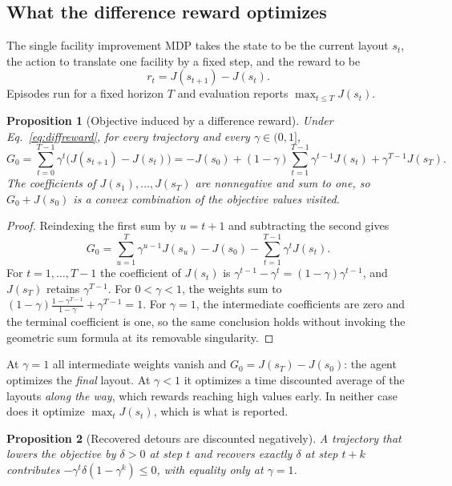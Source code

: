 \documentclass[preprint,12pt,authoryear]{elsarticle}
\newtheorem{prop}{Proposition}
\begin{document}
\subsection{What the difference reward optimizes}
The single facility improvement MDP takes the state to be the current
layout $s_t$, the action to translate one facility by a fixed step, and the
reward to be
\begin{equation}
r_t=J(s_{t+1})-J(s_t).
\label{eq:diffreward}
\end{equation}
Episodes run for a fixed horizon $T$ and evaluation reports
$\max_{t\le T}J(s_t)$.

\begin{prop}[Objective induced by a difference reward]
\label{prop:return}
Under Eq.~\eqref{eq:diffreward}, for every trajectory and every
$\gamma\in(0,1]$,
\begin{equation}
G_0=\sum_{t=0}^{T-1}\gamma^t\big(J(s_{t+1})-J(s_t)\big)
   =-J(s_0)+(1-\gamma)\sum_{t=1}^{T-1}\gamma^{t-1}J(s_t)+\gamma^{T-1}J(s_T).
\label{eq:identity}
\end{equation}
The coefficients of $J(s_1),\dots,J(s_T)$ are nonnegative and sum to one, so
$G_0+J(s_0)$ is a convex combination of the objective values visited.
\end{prop}
\begin{proof}
Reindexing the first sum by $u=t+1$ and subtracting the second gives
\[
G_0=\sum_{u=1}^{T}\gamma^{u-1}J(s_u)-J(s_0)-\sum_{t=1}^{T-1}\gamma^{t}J(s_t).
\]
For $t=1,\dots,T-1$ the coefficient of $J(s_t)$ is
$\gamma^{t-1}-\gamma^{t}=(1-\gamma)\gamma^{t-1}$, and $J(s_T)$ retains
$\gamma^{T-1}$. For $0<\gamma<1$, the weights sum to
$(1-\gamma)\frac{1-\gamma^{T-1}}{1-\gamma}+\gamma^{T-1}=1$.
For $\gamma=1$, the intermediate coefficients are zero and the terminal
coefficient is one, so the same conclusion holds without invoking the geometric
sum formula at its removable singularity.
\end{proof}

At $\gamma=1$ all intermediate weights vanish and $G_0=J(s_T)-J(s_0)$: the
agent optimizes the \emph{final} layout. At $\gamma<1$ it optimizes a
time discounted average of the layouts \emph{along the way}, which rewards
reaching high values early. In neither case does it optimize $\max_t J(s_t)$,
which is what is reported.

\begin{prop}[Recovered detours are discounted negatively]
\label{prop:detour}
A trajectory that lowers the objective by $\delta>0$ at step $t$ and recovers
exactly $\delta$ at step $t+k$ contributes
$-\gamma^t\delta(1-\gamma^k)\le 0$, with equality only at $\gamma=1$.
\end{prop}
\end{document}
